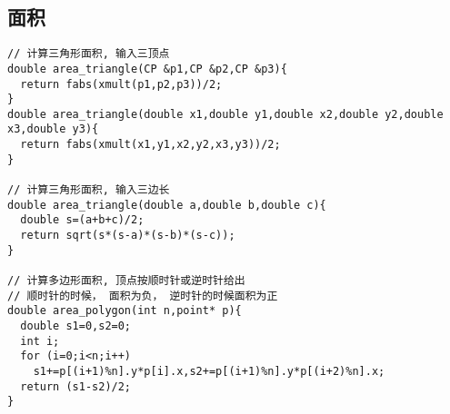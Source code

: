 \subsection{面积}
\begin{lstlisting}[language={}]
// 计算三角形面积, 输入三顶点
double area_triangle(CP &p1,CP &p2,CP &p3){
  return fabs(xmult(p1,p2,p3))/2;
}
double area_triangle(double x1,double y1,double x2,double y2,double x3,double y3){
  return fabs(xmult(x1,y1,x2,y2,x3,y3))/2;
}

// 计算三角形面积, 输入三边长
double area_triangle(double a,double b,double c){
  double s=(a+b+c)/2;
  return sqrt(s*(s-a)*(s-b)*(s-c));
}

// 计算多边形面积, 顶点按顺时针或逆时针给出
// 顺时针的时候， 面积为负， 逆时针的时候面积为正 
double area_polygon(int n,point* p){
  double s1=0,s2=0;
  int i;
  for (i=0;i<n;i++)
    s1+=p[(i+1)%n].y*p[i].x,s2+=p[(i+1)%n].y*p[(i+2)%n].x;
  return (s1-s2)/2;
}
\end{lstlisting}
